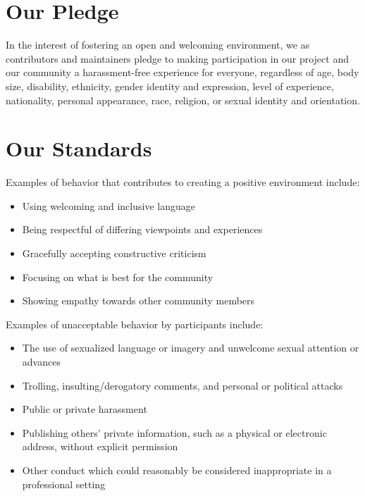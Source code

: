 \documentclass[
  letterpaper,
  oneside,
  open=any]{scrbook}
\providecommand{\tightlist}{%
  \setlength{\itemsep}{0pt}\setlength{\parskip}{0pt}}\usepackage{longtable,booktabs,array}
\begin{document}
\hypertarget{our-pledge}{%
\section{Our Pledge}\label{our-pledge}}

In the interest of fostering an open and welcoming environment, we as
contributors and maintainers pledge to making participation in our
project and our community a harassment-free experience for everyone,
regardless of age, body size, disability, ethnicity, gender identity and
expression, level of experience, nationality, personal appearance, race,
religion, or sexual identity and orientation.

\hypertarget{our-standards}{%
\section{Our Standards}\label{our-standards}}

Examples of behavior that contributes to creating a positive environment
include:

\begin{itemize}
\tightlist
\item
  Using welcoming and inclusive language
\item
  Being respectful of differing viewpoints and experiences
\item
  Gracefully accepting constructive criticism
\item
  Focusing on what is best for the community
\item
  Showing empathy towards other community members
\end{itemize}

Examples of unacceptable behavior by participants include:

\begin{itemize}
\tightlist
\item
  The use of sexualized language or imagery and unwelcome sexual
  attention or advances
\item
  Trolling, insulting/derogatory comments, and personal or political
  attacks
\item
  Public or private harassment
\item
  Publishing others' private information, such as a physical or
  electronic address, without explicit permission
\item
  Other conduct which could reasonably be considered inappropriate in a
  professional setting
\end{itemize}
\end{document}
